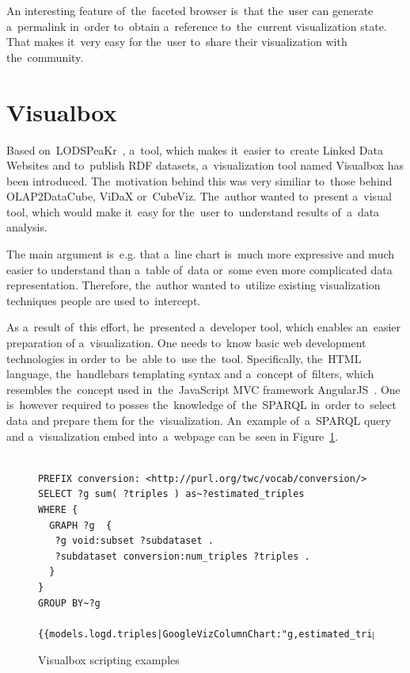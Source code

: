 An interesting feature of~the~faceted browser is~that the~user can 
generate a~permalink in~order to~obtain a~reference to~the~current visualization 
state. That makes it~very easy for the~user to~share their visualization with the~community.

\section{Visualbox}
Based on~LODSPeaKr~\cite{lodspeakr}, a~tool, which makes it~easier to~create Linked Data Websites 
and to~publish RDF datasets, a~visualization tool named Visualbox has been 
introduced. The~motivation behind this was very similiar to~those behind 
OLAP2DataCube, ViDaX or~CubeViz. The~author wanted to~present a~visual tool,
which would 
make it~easy for the~user to~understand results of~a~data analysis.

The main argument is~e.g. that a~line chart is~much more expressive and much easier
to understand than a~table of~data or~some even more complicated data 
representation. Therefore, the~author wanted to~utilize existing visualization 
techniques people are used to~intercept.

As a~result of~this effort, he~presented a~developer tool, which enables an~easier preparation
of a~visualization. One needs to~know basic web development technologies 
in order to~be~able to~use the~tool. Specifically, the~HTML language, the~handlebars templating syntax and a~concept of~filters, which resembles the~concept used in~the~JavaScript MVC framework AngularJS~\cite{angularjs}. One is~however required
to posses the~knowledge of~the~SPARQL in~order to~select data and prepare them for the~visualization. An~example of~a~SPARQL query and a~visualization embed into~a~webpage can be~seen
in Figure~\ref{visualbox-example}.

\begin{figure}
\scriptsize\begin{verbatim}

PREFIX conversion: <http://purl.org/twc/vocab/conversion/>
SELECT ?g sum( ?triples ) as~?estimated_triples
WHERE {
  GRAPH ?g  {
   ?g void:subset ?subdataset .
   ?subdataset conversion:num_triples ?triples .
  }
} 
GROUP BY~?g

{{models.logd.triples|GoogleVizColumnChart:"g,estimated_triples,width=1200"}}
\end{verbatim}\normalsize
\caption{Visualbox scripting examples}
\label{visualbox-example}
\end{figure}

